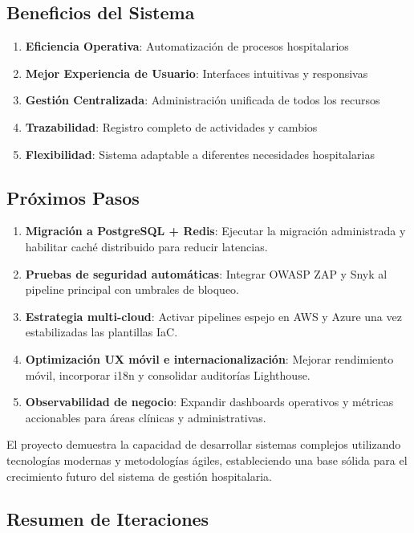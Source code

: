 \documentclass[12pt,a4paper]{article}
\begin{document}
\subsection{Beneficios del Sistema}

\begin{enumerate}
    \item \textbf{Eficiencia Operativa}: Automatización de procesos hospitalarios
    \item \textbf{Mejor Experiencia de Usuario}: Interfaces intuitivas y responsivas
    \item \textbf{Gestión Centralizada}: Administración unificada de todos los recursos
    \item \textbf{Trazabilidad}: Registro completo de actividades y cambios
    \item \textbf{Flexibilidad}: Sistema adaptable a diferentes necesidades hospitalarias
\end{enumerate}

\subsection{Próximos Pasos}

\begin{enumerate}
    \item \textbf{Migración a PostgreSQL + Redis}: Ejecutar la migración administrada y habilitar caché distribuido para reducir latencias.
    \item \textbf{Pruebas de seguridad automáticas}: Integrar OWASP ZAP y Snyk al pipeline principal con umbrales de bloqueo.
    \item \textbf{Estrategia multi-cloud}: Activar pipelines espejo en AWS y Azure una vez estabilizadas las plantillas IaC.
    \item \textbf{Optimización UX móvil e internacionalización}: Mejorar rendimiento móvil, incorporar i18n y consolidar auditorías Lighthouse.
    \item \textbf{Observabilidad de negocio}: Expandir dashboards operativos y métricas accionables para áreas clínicas y administrativas.
\end{enumerate}

El proyecto demuestra la capacidad de desarrollar sistemas complejos utilizando tecnologías modernas y metodologías ágiles, estableciendo una base sólida para el crecimiento futuro del sistema de gestión hospitalaria.

\subsection{Resumen de Iteraciones}
\end{document}
